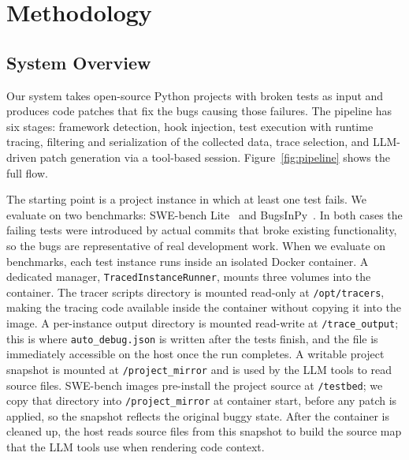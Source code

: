 \chapter{Methodology}
\label{ch:system-methodology}

\section{System Overview}
\label{sec:overview}

Our system takes open-source Python projects with broken tests as input and produces code patches that fix the bugs causing those failures. The pipeline has six stages: framework detection, hook injection, test execution with runtime tracing, filtering and serialization of the collected data, trace selection, and LLM-driven patch generation via a tool-based session. Figure~\ref{fig:pipeline} shows the full flow.

The starting point is a project instance in which at least one test fails. We evaluate on two benchmarks: SWE-bench Lite~\citep{jimenez2023swebench} and BugsInPy~\citep{widyasari2020bugsinpy}. In both cases the failing tests were introduced by actual commits that broke existing functionality, so the bugs are representative of real development work. When we evaluate on benchmarks, each test instance runs inside an isolated Docker container. A dedicated manager, \texttt{TracedInstanceRunner}, mounts three volumes into the container. The tracer scripts directory is mounted read-only at \texttt{/opt/tracers}, making the tracing code available inside the container without copying it into the image. A per-instance output directory is mounted read-write at \texttt{/trace\_output}; this is where \texttt{auto\_debug.json} is written after the tests finish, and the file is immediately accessible on the host once the run completes. A writable project snapshot is mounted at \texttt{/project\_mirror} and is used by the LLM tools to read source files. SWE-bench images pre-install the project source at \texttt{/testbed}; we copy that directory into \texttt{/project\_mirror} at container start, before any patch is applied, so the snapshot reflects the original buggy state. After the container is cleaned up, the host reads source files from this snapshot to build the source map that the LLM tools use when rendering code context.

